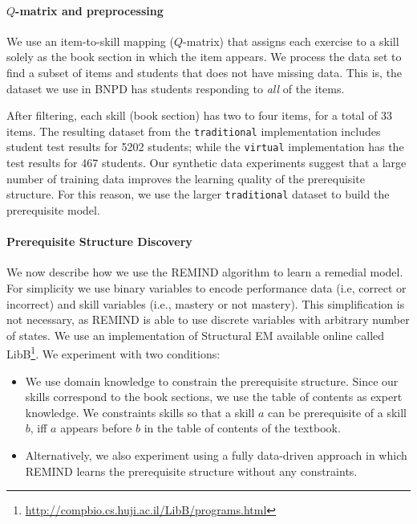 \documentclass{edm_template}
\begin{document}
{	\paragraph{$Q$-matrix and preprocessing}
	\label{sec:preprocessing}
	We use an item-to-skill mapping ($Q$-matrix) that assigns each exercise to a skill solely as the book section in which the item appears.
	We process the data set to find a subset of  items and students that does not have missing data.
	This is,  the dataset we use in BNPD has students responding to \textit{all} of the  items.
	
	After filtering, each skill (book section) has two to four items, for a total of  33  items.
	The resulting dataset from the \texttt{traditional} implementation includes student test results for 5202 students; 
	while the \texttt{virtual} implementation has the test results for 467 students.
	Our synthetic data experiments suggest that a large number of training data improves the learning quality of the prerequisite structure.
	For this reason, we use the larger \texttt{traditional} dataset to build the prerequisite model.
	
	
	\paragraph{Prerequisite Structure Discovery}
	\label{sec:prerequisite_results}
	We now describe how we use the REMIND algorithm to learn a remedial model.
	For simplicity we use binary variables to encode  performance data (i.e, correct or incorrect) and skill variables  (i.e., mastery or not mastery).
	This simplification is not necessary,  as REMIND is able to use  discrete variables with arbitrary number of states.
	We use an implementation of Structural EM available online called LibB\footnote{\url{http://compbio.cs.huji.ac.il/LibB/programs.html}}.
	We experiment with two conditions:
	\begin{itemize}[noitemsep,topsep=2pt,parsep=0pt,partopsep=0pt]
		\item We use domain knowledge to constrain the prerequisite structure.
		Since our skills correspond to the book sections, we use  the table of contents as expert knowledge.
		We constraints skills so that a skill $a$ can be prerequisite of a skill $b$, iff $a$ appears before $b$ in the table of contents of the textbook.
		\item Alternatively, we also experiment using a fully data-driven approach in which REMIND learns the prerequisite structure without any constraints.
	\end{itemize} 
	
}
\end{document}
